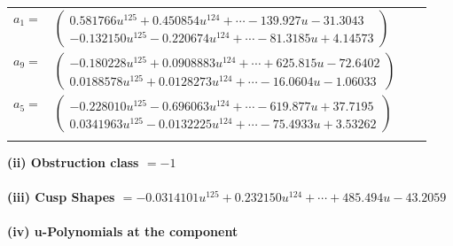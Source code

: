 \documentclass[1p]{elsarticle_modified}
\theoremstyle{definition}
\begin{document}
\begin{tabular}{m{7pt} m{180pt} m{7pt} m{180pt} }
\flushright $a_{1}=$&$\begin{pmatrix}0.581766 u^{125}+0.450854 u^{124}+\cdots-139.927 u-31.3043\\-0.132150 u^{125}-0.220674 u^{124}+\cdots-81.3185 u+4.14573\end{pmatrix}$ \\
\flushright $a_{9}=$&$\begin{pmatrix}-0.180228 u^{125}+0.0908883 u^{124}+\cdots+625.815 u-72.6402\\0.0188578 u^{125}+0.0128273 u^{124}+\cdots-16.0604 u-1.06033\end{pmatrix}$ \\
\flushright $a_{5}=$&$\begin{pmatrix}-0.228010 u^{125}-0.696063 u^{124}+\cdots-619.877 u+37.7195\\0.0341963 u^{125}-0.0132225 u^{124}+\cdots-75.4933 u+3.53262\end{pmatrix}$\\&\end{tabular}
\flushleft \textbf{(ii) Obstruction class $= -1$}\\~\\
\flushleft \textbf{(iii) Cusp Shapes $= -0.0314101 u^{125}+0.232150 u^{124}+\cdots+485.494 u-43.2059$}\\~\\
\newpage\renewcommand{\arraystretch}{1}
\flushleft \textbf{(iv) u-Polynomials at the component}\newline \\
\end{document}
